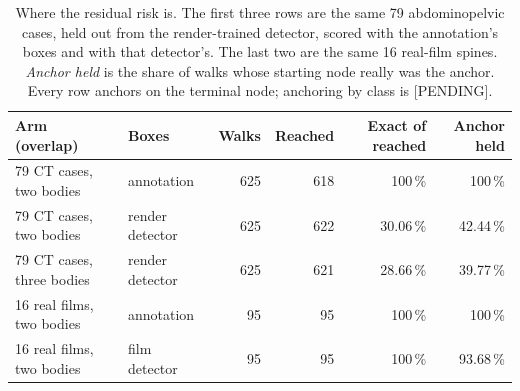 \documentclass[11pt,letterpaper]{article}
\newcommand{\pc}[1]{#1\,\%}
\begin{document}
\begin{table}[htbp]\centering
\caption{Where the residual risk is. The first three rows are the same 79 abdominopelvic cases, held out
from the render-trained detector, scored with the annotation's boxes and with that detector's. The last two
are the same 16 real-film spines. \emph{Anchor held} is the share of walks whose starting node really was
the anchor. Every row anchors on the terminal node; anchoring by class is [PENDING].}
\label{tab:boxes}
\small
\begin{tabular}{l l r r r r}
\toprule
Arm (overlap) & Boxes & Walks & Reached & Exact of reached & Anchor held\\
\midrule
79 CT cases, two bodies   & annotation      & 625 & 618 & \pc{100}   & \pc{100}\\
79 CT cases, two bodies   & render detector & 625 & 622 & \pc{30.06} & \pc{42.44}\\
79 CT cases, three bodies & render detector & 625 & 621 & \pc{28.66} & \pc{39.77}\\
\midrule
16 real films, two bodies & annotation      &  95 &  95 & \pc{100} & \pc{100}\\
16 real films, two bodies & film detector   &  95 &  95 & \pc{100} & \pc{93.68}\\
\bottomrule
\end{tabular}
\end{table}

\clearpage


\end{document}
